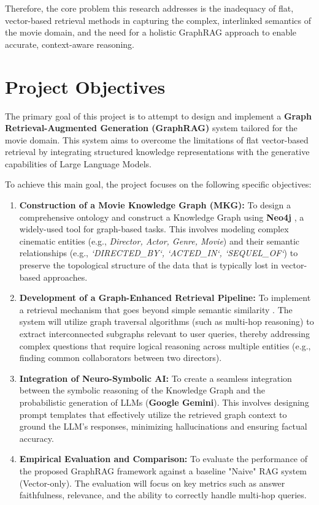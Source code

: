 \documentclass[a4paper, 12pt]{extreport}
\begin{document}
Therefore, the core problem this research addresses is the inadequacy of flat, vector-based retrieval methods in capturing the complex, interlinked semantics of the movie domain, and the need for a holistic GraphRAG \cite{han2025retrievalaugmentedgenerationgraphsgraphrag} approach to enable accurate, context-aware reasoning.
\section{Project Objectives}
The primary goal of this project is to attempt to design and implement a \textbf{Graph Retrieval-Augmented Generation (GraphRAG)} \cite{han2025retrievalaugmentedgenerationgraphsgraphrag} system tailored for the movie domain. This system aims to overcome the limitations of flat vector-based retrieval by integrating structured knowledge representations with the generative capabilities of Large Language Models.

To achieve this main goal, the project focuses on the following specific objectives:

\begin{enumerate}
    \item \textbf{Construction of a Movie Knowledge Graph (MKG):} 
    To design a comprehensive ontology and construct a Knowledge Graph using \textbf{Neo4j} \cite{neo4j}, a widely-used tool for graph-based tasks. This involves modeling complex cinematic entities (e.g., \textit{Director, Actor, Genre, Movie}) and their semantic relationships (e.g., \textit{`DIRECTED\_BY`, `ACTED\_IN`, `SEQUEL\_OF`}) to preserve the topological structure of the data that is typically lost in vector-based approaches.

    \item \textbf{Development of a Graph-Enhanced Retrieval Pipeline:} 
    To implement a retrieval mechanism that goes beyond simple semantic similarity \cite{10.1145/361219.361220,reimers2019sentencebert}. The system will utilize graph traversal algorithms (such as multi-hop reasoning) to extract interconnected subgraphs relevant to user queries, thereby addressing complex questions that require logical reasoning across multiple entities (e.g., finding common collaborators between two directors).

    \item \textbf{Integration of Neuro-Symbolic AI:} 
    To create a seamless integration between the symbolic reasoning of the Knowledge Graph and the probabilistic generation of LLMs (\textbf{Google Gemini}). This involves designing prompt templates that effectively utilize the retrieved graph context to ground the LLM's responses, minimizing hallucinations and ensuring factual accuracy.

    \item \textbf{Empirical Evaluation and Comparison:} 
    To evaluate the performance of the proposed GraphRAG framework against a baseline "Naive" RAG system (Vector-only). The evaluation will focus on key metrics such as answer faithfulness, relevance, and the ability to correctly handle multi-hop queries.
\end{enumerate}
\end{document}

